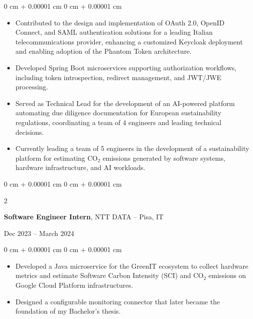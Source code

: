 \documentclass[10pt, letterpaper]{article}
\newenvironment{highlights}{
    \begin{itemize}[
        topsep=0.10 cm,
        parsep=0.10 cm,
        partopsep=0pt,
        itemsep=0pt,
        leftmargin=0 cm + 10pt
    ]
}{
    \end{itemize}
} %
\newenvironment{onecolentry}{
    \begin{adjustwidth}{
        0 cm + 0.00001 cm
    }{
        0 cm + 0.00001 cm
    }
}{
    \end{adjustwidth}
} %
\newenvironment{twocolentry}[2][]{
    \onecolentry
    \def\secondColumn{#2}
    \setcolumnwidth{\fill, 4.5 cm}
    \begin{paracol}{2}
}{
    \switchcolumn \raggedleft \secondColumn
    \end{paracol}
    \endonecolentry
} %
\begin{document}
\vspace{0.10 cm}
\begin{onecolentry}
    \begin{highlights}

        \item Contributed to the design and implementation of OAuth 2.0, OpenID Connect, and SAML authentication solutions for a leading Italian telecommunications provider, enhancing a customized Keycloak deployment and enabling adoption of the Phantom Token architecture.

        \item Developed Spring Boot microservices supporting authorization workflows, including token introspection, redirect management, and JWT/JWE processing.

        \item Served as Technical Lead for the development of an AI-powered platform automating due diligence documentation for European sustainability regulations, coordinating a team of 4 engineers and leading technical decisions.

        \item Currently leading a team of 5 engineers in the development of a sustainability platform for estimating CO$_2$ emissions generated by software systems, hardware infrastructure, and AI workloads.
    \end{highlights}
\end{onecolentry}

\vspace{0.1 cm}

\begin{twocolentry}{
        Dec 2023 – March 2024
    }
    \textbf{Software Engineer Intern}, NTT DATA -- Pisa, IT
\end{twocolentry}

\vspace{0.10 cm}
\begin{onecolentry}
    \begin{highlights}
        \item Developed a Java microservice for the GreenIT ecosystem to collect hardware metrics and estimate Software Carbon Intensity (SCI) and CO$_2$ emissions on Google Cloud Platform infrastructures.

        \item Designed a configurable monitoring connector that later became the foundation of my Bachelor's thesis.
    \end{highlights}
\end{onecolentry}
\end{document}
